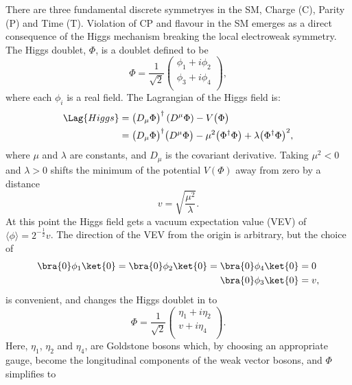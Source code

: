 There are three fundamental discrete symmetryes in the SM, Charge (C), Parity (P) and Time (T).
Violation of CP and flavour in the SM emerges as a direct consequence of the Higgs mechanism
breaking the local electroweak symmetry.
The Higgs doublet, $\Phi$, is a doublet defined to be
\begin{equation}
  \Phi = \frac{1}{\sqrt{2}}
  \begin{pmatrix}
    \phi_1 + i\phi_2 \\
    \phi_3 + i\phi_4 \\
  \end{pmatrix},
  \label{eq:th:phi}
\end{equation}
where each $\phi_i$ is a real field.
The Lagrangian of the Higgs field is:
\begin{align}
  \Lag{Higgs}
  &= \big(D_\mu\Phi\big)^\dagger\left(D^\mu\Phi\right) - V\big(\Phi\big) \nonumber\\
  &= \big(D_\mu\Phi\big)^\dagger\big(D^\mu\Phi\big) - \mu^2\big(\Phi^\dagger\Phi\big) +
  \lambda\big(\Phi^\dagger\Phi\big)^{2},
  \label{eq:th:laghiggs1}
\end{align}
where $\mu$ and $\lambda$ are constants, and $D_\mu$ is the covariant derivative.
Taking $\mu^2<0$ and $\lambda>0$ shifts the minimum of the potential $V(\Phi)$ away from zero by a distance
\begin{equation}
  v = \sqrt{\frac{\mu^2}{\lambda}}.
\end{equation}
At this point the Higgs field gets a vacuum expectation value (VEV)
of $\langle\phi\rangle = 2^{-\tfrac{1}{2}}v$.
The direction of the VEV from the origin is arbitrary, but the choice of
\begin{align}
  \bra{0}\phi_1\ket{0} =
  \bra{0}\phi_2\ket{0} =
  \bra{0}\phi_4\ket{0} &= 0 \nonumber\\
  \bra{0}\phi_3\ket{0} &= v,
\end{align}
is convenient, and changes the Higgs doublet in  to
\begin{equation}
  \Phi = \frac{1}{\sqrt{2}}
  \begin{pmatrix}
    \eta_1 + i\eta_2 \\
    v + i\eta_4 \\
  \end{pmatrix}.
  \label{eq:th:eta}
\end{equation}
Here, $\eta_1$, $\eta_2$ and $\eta_4$, are Goldstone bosons which, by choosing an appropriate
gauge, become the longitudinal components of the weak vector bosons, and $\Phi$ simplifies to
